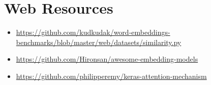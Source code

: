 \documentclass[10pt,a4paper]{article}
\begin{document}
\section*{Web Resources}
\label{web_resources}
\begin{itemize}
	\item \url{https://github.com/kudkudak/word-embeddings-benchmarks/blob/master/web/datasets/similarity.py}
	\item \url{https://github.com/Hironsan/awesome-embedding-models}
	\item \url{https://github.com/philipperemy/keras-attention-mechanism}
\end{itemize}



\nocite{*}




	
	
\end{document}
